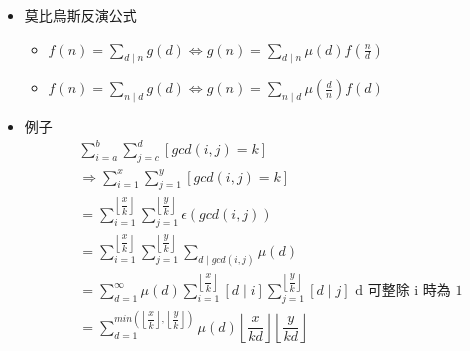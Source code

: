 \begin{itemize}
\item 莫比烏斯反演公式
	\begin{itemize}
		\item $f(n)=\sum_{d\mid n}g(d)\Leftrightarrow g(n)=\sum_{d\mid n}\mu(d)f(\frac{n}{d})$
		\item $f(n)=\sum_{n\mid d}g(d)\Leftrightarrow g(n)=\sum_{n\mid d}\mu(\frac{d}{n})f(d)$
	\end{itemize}

\item 例子
$$ \begin{aligned}
	&\sum_{i = a}^{b} \sum_{j = c}^{d} [gcd(i, j) = k]\\
	&\Rightarrow \sum_{i = 1}^{x} \sum_{j = 1}^{y} [gcd(i, j) = k]\\
	&= \sum_{i = 1}^{\left\lfloor\dfrac {x}{k} \right\rfloor} \sum_{j = 1}^{\left\lfloor\dfrac {y}{k} \right\rfloor} \epsilon(gcd(i, j))\\
	&= \sum_{i = 1}^{\left\lfloor\dfrac {x}{k} \right\rfloor} \sum_{j = 1}^{\left\lfloor\dfrac {y}{k} \right\rfloor} \sum_{d \mid gcd(i, j)} \mu(d)\\
	&= \sum_{d = 1}^{\infty} \mu(d) \sum_{i = 1}^{\left\lfloor\dfrac {x}{k} \right\rfloor} [d \mid i] \sum_{j = 1}^{\left\lfloor\dfrac {y}{k} \right\rfloor} [d \mid j] \text{\ \ d 可整除 i 時為 1}\\
	&= \sum_{d = 1}^{min(\left\lfloor\dfrac {x}{k} \right\rfloor, \left\lfloor\dfrac {y}{k} \right\rfloor)} \mu(d) \left\lfloor\dfrac {x}{kd} \right\rfloor \left\lfloor\dfrac {y}{kd} \right\rfloor
\end{aligned} $$
\end{itemize}